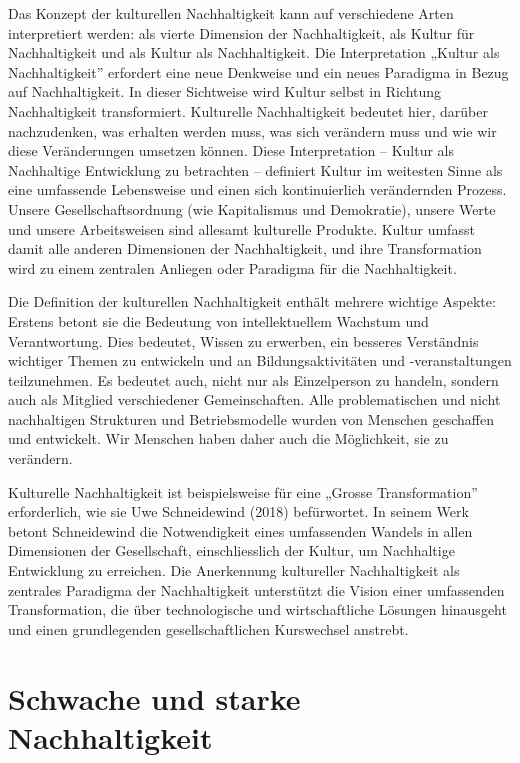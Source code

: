 \documentclass[
  nswissgerman,
  a4paper,
  openany]{book}
\begin{document}
Das Konzept der kulturellen Nachhaltigkeit kann auf verschiedene Arten
interpretiert werden: als vierte Dimension der Nachhaltigkeit, als
Kultur für Nachhaltigkeit und als Kultur als Nachhaltigkeit. Die
Interpretation „Kultur als Nachhaltigkeit'' erfordert eine neue
Denkweise und ein neues Paradigma in Bezug auf Nachhaltigkeit. In dieser
Sichtweise wird Kultur selbst in Richtung Nachhaltigkeit transformiert.
Kulturelle Nachhaltigkeit bedeutet hier, darüber nachzudenken, was
erhalten werden muss, was sich verändern muss und wie wir diese
Veränderungen umsetzen können. Diese Interpretation -- Kultur als
Nachhaltige Entwicklung zu betrachten -- definiert Kultur im weitesten
Sinne als eine umfassende Lebensweise und einen sich kontinuierlich
verändernden Prozess. Unsere Gesellschaftsordnung (wie Kapitalismus und
Demokratie), unsere Werte und unsere Arbeitsweisen sind allesamt
kulturelle Produkte. Kultur umfasst damit alle anderen Dimensionen der
Nachhaltigkeit, und ihre Transformation wird zu einem zentralen Anliegen
oder Paradigma für die Nachhaltigkeit.

Die Definition der kulturellen Nachhaltigkeit enthält mehrere wichtige
Aspekte: Erstens betont sie die Bedeutung von intellektuellem Wachstum
und Verantwortung. Dies bedeutet, Wissen zu erwerben, ein besseres
Verständnis wichtiger Themen zu entwickeln und an Bildungsaktivitäten
und -veranstaltungen teilzunehmen. Es bedeutet auch, nicht nur als
Einzelperson zu handeln, sondern auch als Mitglied verschiedener
Gemeinschaften. Alle problematischen und nicht nachhaltigen Strukturen
und Betriebsmodelle wurden von Menschen geschaffen und entwickelt. Wir
Menschen haben daher auch die Möglichkeit, sie zu verändern.

Kulturelle Nachhaltigkeit ist beispielsweise für eine „Grosse
Transformation'' erforderlich, wie sie Uwe Schneidewind (2018)
befürwortet. In seinem Werk betont Schneidewind die Notwendigkeit eines
umfassenden Wandels in allen Dimensionen der Gesellschaft,
einschliesslich der Kultur, um Nachhaltige Entwicklung zu erreichen. Die
Anerkennung kultureller Nachhaltigkeit als zentrales Paradigma der
Nachhaltigkeit unterstützt die Vision einer umfassenden Transformation,
die über technologische und wirtschaftliche Lösungen hinausgeht und
einen grundlegenden gesellschaftlichen Kurswechsel anstrebt.

\section{Schwache und starke
Nachhaltigkeit}\label{schwache-und-starke-nachhaltigkeit}
\end{document}
